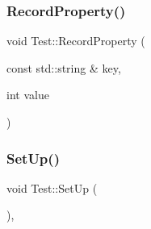 \subsubsection{\texorpdfstring{Record\+Property()}{RecordProperty()}\hspace{0.1cm}{\footnotesize\ttfamily [2/2]}}
{\footnotesize\ttfamily void Test\+::\+Record\+Property (\begin{DoxyParamCaption}\item[{const std\+::string \&}]{key,  }\item[{int}]{value }\end{DoxyParamCaption})\hspace{0.3cm}{\ttfamily [static]}}

\mbox{\label{classtesting_1_1_test_a190315150c303ddf801313fd1a777733}} 
\subsubsection{\texorpdfstring{Set\+Up()}{SetUp()}}
{\footnotesize\ttfamily void Test\+::\+Set\+Up (\begin{DoxyParamCaption}{ }\end{DoxyParamCaption})\hspace{0.3cm}{\ttfamily [protected]}, {\ttfamily [virtual]}}



